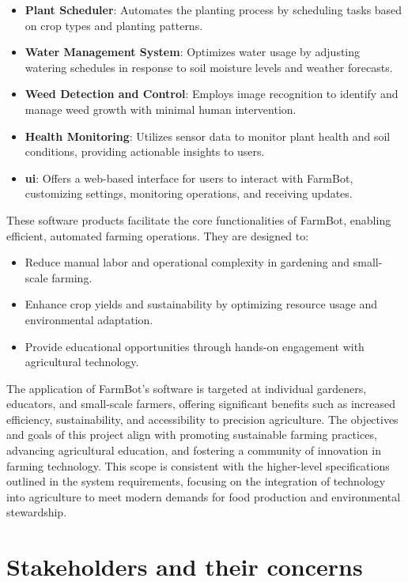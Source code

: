 \begin{itemize}
    \item \textbf{Plant Scheduler}: Automates the planting process by scheduling tasks based on crop types and planting patterns.
    \item \textbf{Water Management System}: Optimizes water usage by adjusting watering schedules in response to soil moisture levels and weather forecasts.
    \item \textbf{Weed Detection and Control}: Employs image recognition to identify and manage weed growth with minimal human intervention.
    \item \textbf{Health Monitoring}: Utilizes sensor data to monitor plant health and soil conditions, providing actionable insights to users.
    \item \textbf{\gls{ui}}: Offers a web-based interface for users to interact with FarmBot, customizing settings, monitoring operations, and receiving updates.
\end{itemize}

These software products facilitate the core functionalities of FarmBot, enabling efficient, automated farming operations. They are designed to:

\begin{itemize}
    \item Reduce manual labor and operational complexity in gardening and small-scale farming.
    \item Enhance crop yields and sustainability by optimizing resource usage and environmental adaptation.
    \item Provide educational opportunities through hands-on engagement with agricultural technology.
\end{itemize}

The application of FarmBot's software is targeted at individual gardeners, educators, and small-scale farmers, offering significant benefits such as increased efficiency, sustainability, and accessibility to precision agriculture. The objectives and goals of this project align with promoting sustainable farming practices, advancing agricultural education, and fostering a community of innovation in farming technology. This scope is consistent with the higher-level specifications outlined in the system requirements, focusing on the integration of technology into agriculture to meet modern demands for food production and environmental stewardship.
\cite{farmbotDocs}
\section{Stakeholders and their concerns}

